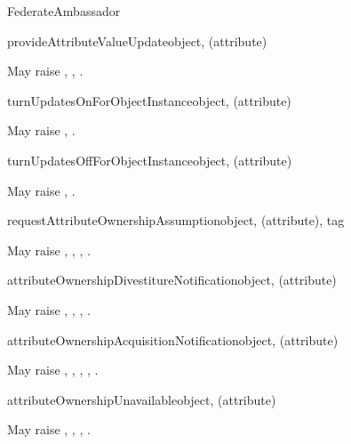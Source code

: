 \begin{classdesc}{FederateAmbassador}{}
\begin{methoddesc}{provideAttributeValueUpdate}{object, (attribute)}

May raise
,
,
.
\end{methoddesc}

\begin{methoddesc}{turnUpdatesOnForObjectInstance}{object, (attribute)}

May raise
,
.
\end{methoddesc}

\begin{methoddesc}{turnUpdatesOffForObjectInstance}{object, (attribute)}

May raise
,
.
\end{methoddesc}

\medskip
{}

\begin{methoddesc}{requestAttributeOwnershipAssumption}{object, (attribute), tag}

May raise
,
,
,
.
\end{methoddesc}

\begin{methoddesc}{attributeOwnershipDivestitureNotification}{object, (attribute)}

May raise
,
,
,
.
\end{methoddesc}

\begin{methoddesc}{attributeOwnershipAcquisitionNotification}{object, (attribute)}

May raise
,
,
,
,
.
\end{methoddesc}

\begin{methoddesc}{attributeOwnershipUnavailable}{object, (attribute)}

May raise
,
,
,
.
\end{methoddesc}


\end{classdesc}
